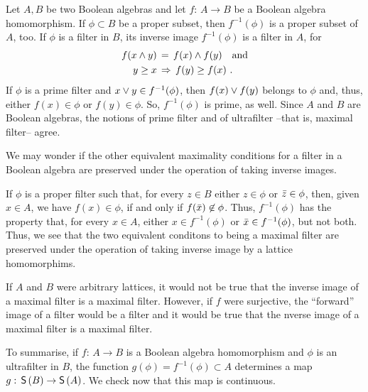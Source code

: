 Let $A,B$ be two Boolean algebras and let $f:\,A\rightarrow B$ be a
Boolean algebra homomorphism. If $\phi\subset B$ be a proper subset,
then $f^{-1}(\phi)$ is a proper subset of $A$, too. If $\phi$ is a filter
in $B$, its inverse image $f^{-1}(\phi)$ is a filter in $A$, for
\begin{align*}
	f(x\wedge y) & \,=\, f(x)\wedge f(y)\quad\text{and} \\
	y\geq x & \,\Rightarrow\, f(y)\geq f(x)
	\text{ .}
\end{align*}
%
If $\phi$ is a prime filter and $x\vee y\in f^{-1}(\phi)$, then
$f(x)\vee f(y)$ belongs to $\phi$ and, thus, either $f(x)\in\phi$ or
$f(y)\in\phi$. So, $f^{-1}(\phi)$ is prime, as well. Since $A$ and $B$ are
Boolean algebras, the notions of prime filter and of ultrafilter --that is,
maximal filter-- agree.

\begin{remarkTheOtherMaximalityConditions}
	We may wonder if the other equivalent maximality conditions
	for a filter in a Boolean algebra are preserved under the
	operation of taking inverse images.

	If $\phi$ is a proper filter such that, for every $z\in B$
	either $z\in\phi$ or $\bar{z}\in\phi$, then, given $x\in A$,
	we have $f(x)\in\phi$, if and only if $f(\bar{x})\not\in\phi$.
	Thus, $f^{-1}(\phi)$ has the property that, for every $x\in A$,
	either $x\in f^{-1}(\phi)$ or $\bar{x}\in f^{-1}(\phi)$, but not
	both. Thus, we see that the two equivalent conditons to being a
	maximal filter are preserved under the operation of taking inverse
	image by a lattice homomorphims.

	If $A$ and $B$ were arbitrary lattices, it would not be true that
	the inverse image of a maximal filter is a maximal filter. However,
	if $f$ were surjective, the ``forward'' image of a filter would be
	a filter and it would be true that the nverse image of a maximal
	filter is a maximal filter.
\end{remarkTheOtherMaximalityConditions}

To summarise, if $f:\,A\rightarrow B$ is a Boolean algebra homomorphism and
$\phi$ is an ultrafilter in $B$, the function $g(\phi)=f^{-1}(\phi)\subset A$
determines a map $g:\,\mathsf{S}\left(B\right)\rightarrow\mathsf{S}\left(A\right)$. We check now that
this map is continuous.

